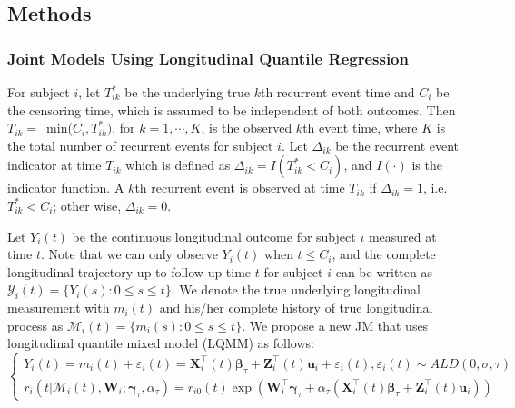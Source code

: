 

\subsection{Methods}\label{sec:p3methods}
\renewcommand{\thesubsubsection}{\thesubsection.\arabic{subsubsection}}

\subsubsection{Joint Models Using Longitudinal Quantile Regression}
For subject $i$, let $T_{ik}^*$ be the underlying true $k$th recurrent event time and $C_i$ be the censoring time, which is assumed to be independent of both outcomes. Then $T_{ik} = $\mbox{ min}($C_i, T_{ik}^*)$, for $k=1, \cdots, K$, is the observed $k$th event time, where $K$ is the total number of recurrent events for subject $i$. Let $\Delta_{ik}$ be the recurrent event indicator at time $T_{ik}$ which is defined as $\Delta_{ik} = I(T_{ik}^* < C_i)$, and $I(\cdot)$ is the indicator function. A $k$th recurrent event is observed at time $T_{ik}$ if $\Delta_{ik}=1$, i.e. $T_{ik}^* < C_i$; other wise, $\Delta_{ik}=0$.

Let $Y_{i}(t)$ be the continuous longitudinal outcome for subject $i$ measured at time $t$. Note that we can only observe $Y_{i}(t)$ when $t\le C_i$, and the complete longitudinal trajectory up to follow-up time $t$ for subject $i$ can be written as $\mathcal{Y}_{i}(t)=\{Y_{i}(s): 0\le s\le t\}$. We denote the true underlying longitudinal measurement with $m_{i}(t)$ and his/her complete history of true longitudinal process as $\mathcal{M}_{i}(t)=\{m_{i}(s): 0\le s \le t\}$. We propose a new JM that uses longitudinal quantile mixed model (LQMM) as follows:
\begin{equation}\label{eqn:p3joint}
\left\{
\begin{array}{l}
Y_{i}(t) = m_{i}(t) + \varepsilon_{i}(t) = {\boldsymbol X}_{i}^{\top}(t)\boldsymbol{\beta}_{\tau} + {\boldsymbol Z}_{i}^{\top}(t){\boldsymbol u}_i + \varepsilon_{i}(t), \varepsilon_{i}(t)\sim ALD(0, \sigma, \tau)\\
r_i(t|\mathcal{M}_{i}(t), {\boldsymbol W}_i;  \boldsymbol{\gamma}_{\tau}, \alpha_{\tau}) = r_{i0}(t)\exp({\boldsymbol W}_i^{\top}\boldsymbol{\gamma}_{\tau} + \alpha_{\tau}({\boldsymbol X}^{\top}_{i}(t)\boldsymbol{\beta}_{\tau} + {\boldsymbol Z}^{\top}_{i}(t){\boldsymbol u}_{i}))
\end{array}
\right.
\end{equation}

